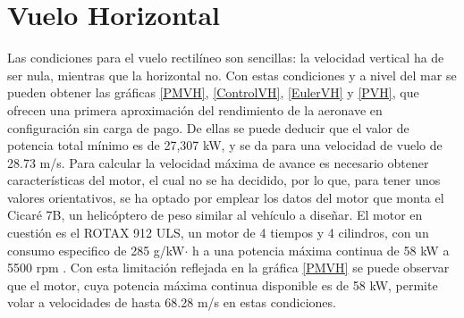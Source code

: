 \thispagestyle{empty}
\chapter{Vuelo Horizontal}

Las condiciones para el vuelo rectilíneo son sencillas: la velocidad vertical ha de ser nula, mientras que la horizontal no. Con estas condiciones y a nivel del mar se pueden obtener las gráficas \ref{PMVH}, \ref{ControlVH}, \ref{EulerVH} y \ref{PVH}, que ofrecen una primera aproximación del rendimiento de la aeronave en configuración sin carga de pago. De ellas se puede deducir que el valor de potencia total mínimo es de 27,307 kW, y se da para una velocidad de vuelo de 28.73 m/s. Para calcular la velocidad máxima de avance es necesario obtener características del motor, el cual no se ha decidido, por lo que, para tener unos valores orientativos, se ha optado por emplear los datos del motor que monta el Cicaré 7B, un helicóptero de peso similar al vehículo a diseñar. El motor en cuestión es el ROTAX 912 ULS, un motor de 4 tiempos y 4 cilindros, con un consumo especifico de 285 g/kW$\cdot$ h a una potencia máxima continua de 58 kW a 5500 rpm \citep{ROTAX}. Con esta limitación reflejada en la gráfica \ref{PMVH} se puede observar que el motor, cuya potencia máxima continua disponible es de 58 kW, permite volar a velocidades de hasta 68.28 m/s en estas condiciones.

